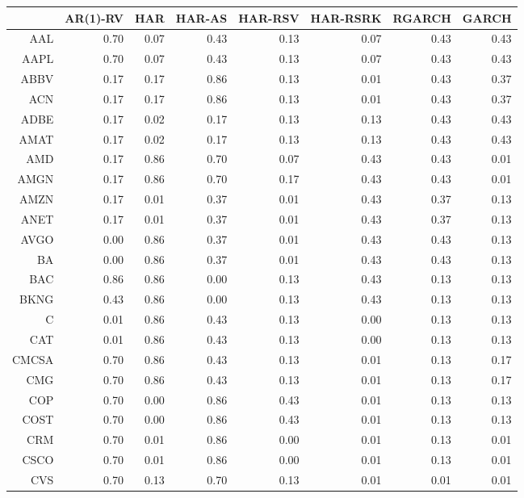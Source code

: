 \begin{table}[ht]
\centering
\begin{tabular}{rrrrrrrr}
  \hline
 & AR(1)-RV & HAR & HAR-AS & HAR-RSV & HAR-RSRK & RGARCH & GARCH \\ 
  \hline
AAL & 0.70 & 0.07 & 0.43 & 0.13 & 0.07 & 0.43 & 0.43 \\ 
  AAPL & 0.70 & 0.07 & 0.43 & 0.13 & 0.07 & 0.43 & 0.43 \\ 
  ABBV & 0.17 & 0.17 & 0.86 & 0.13 & 0.01 & 0.43 & 0.37 \\ 
  ACN & 0.17 & 0.17 & 0.86 & 0.13 & 0.01 & 0.43 & 0.37 \\ 
  ADBE & 0.17 & 0.02 & 0.17 & 0.13 & 0.13 & 0.43 & 0.43 \\ 
  AMAT & 0.17 & 0.02 & 0.17 & 0.13 & 0.13 & 0.43 & 0.43 \\ 
  AMD & 0.17 & 0.86 & 0.70 & 0.07 & 0.43 & 0.43 & 0.01 \\ 
  AMGN & 0.17 & 0.86 & 0.70 & 0.17 & 0.43 & 0.43 & 0.01 \\ 
  AMZN & 0.17 & 0.01 & 0.37 & 0.01 & 0.43 & 0.37 & 0.13 \\ 
  ANET & 0.17 & 0.01 & 0.37 & 0.01 & 0.43 & 0.37 & 0.13 \\ 
  AVGO & 0.00 & 0.86 & 0.37 & 0.01 & 0.43 & 0.43 & 0.13 \\ 
  BA & 0.00 & 0.86 & 0.37 & 0.01 & 0.43 & 0.43 & 0.13 \\ 
  BAC & 0.86 & 0.86 & 0.00 & 0.13 & 0.43 & 0.13 & 0.13 \\ 
  BKNG & 0.43 & 0.86 & 0.00 & 0.13 & 0.43 & 0.13 & 0.13 \\ 
  C & 0.01 & 0.86 & 0.43 & 0.13 & 0.00 & 0.13 & 0.13 \\ 
  CAT & 0.01 & 0.86 & 0.43 & 0.13 & 0.00 & 0.13 & 0.13 \\ 
  CMCSA & 0.70 & 0.86 & 0.43 & 0.13 & 0.01 & 0.13 & 0.17 \\ 
  CMG & 0.70 & 0.86 & 0.43 & 0.13 & 0.01 & 0.13 & 0.17 \\ 
  COP & 0.70 & 0.00 & 0.86 & 0.43 & 0.01 & 0.13 & 0.13 \\ 
  COST & 0.70 & 0.00 & 0.86 & 0.43 & 0.01 & 0.13 & 0.13 \\ 
  CRM & 0.70 & 0.01 & 0.86 & 0.00 & 0.01 & 0.13 & 0.01 \\ 
  CSCO & 0.70 & 0.01 & 0.86 & 0.00 & 0.01 & 0.13 & 0.01 \\ 
  CVS & 0.70 & 0.13 & 0.70 & 0.13 & 0.01 & 0.01 & 0.01 \\ 

\end{tabular}
\end{table}
